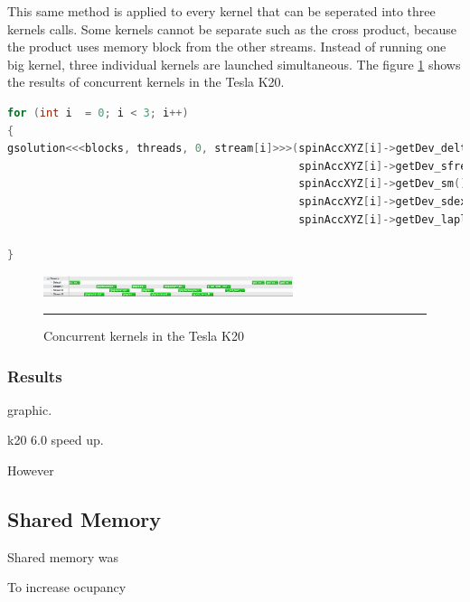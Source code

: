 This same method is applied to every kernel that can be seperated into three kernels calls. Some kernels cannot be separate such as the cross product, because the product uses memory block from the other streams. Instead of running one big kernel, three individual kernels are launched simultaneous. The figure \ref{fig:concurrent} shows the results of concurrent kernels in the Tesla K20.

\begin{lstlisting}[language=C++, caption={Evaluation of individual coordinates of the Zhang and Li model}]
for (int i  = 0; i < 3; i++)
{
gsolution<<<blocks, threads, 0, stream[i]>>>(spinAccXYZ[i]->getDev_deltam(),
											 spinAccXYZ[i]->getDev_sfrelax(), 
											 spinAccXYZ[i]->getDev_sm(), 
											 spinAccXYZ[i]->getDev_sdex(),
											 spinAccXYZ[i]->getDev_lapl());

}
\end{lstlisting}


\begin{figure}[htbp]
	\centering
		\includegraphics[width=0.65\textwidth]{Figures/concurent.png}
		\rule{35em}{0.2pt}
	\caption[Streams kernels Tesla K20]{Concurrent kernels in the Tesla K20
}
	\label{fig:concurrent}
\end{figure}


\subsubsection{Results}

graphic.

k20  6.0 speed up.

However


\subsection{Shared Memory}

Shared memory was

To increase ocupancy

\begin{lstlisting}[language=C++, caption={Evaluation of individual coordinates of the Zhang and Li model}]


\end{lstlisting}


